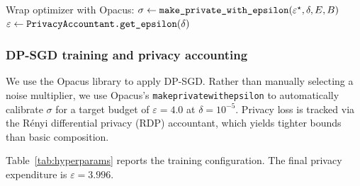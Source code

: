 \documentclass[12pt,letterpaper]{article}
\renewcommand{\_}{\textunderscore\allowbreak}
\begin{document}
\begin{algorithm}[ht]
\caption{DP-VAE training with DP-SGD}
\label{alg:dpvae}
Wrap optimizer with Opacus: $\sigma \gets \texttt{make\_private\_with\_epsilon}(\varepsilon^\star, \delta, E, B)$\;
$\varepsilon \gets \texttt{PrivacyAccountant.get\_epsilon}(\delta)$\;
\end{algorithm}

\subsubsection{DP-SGD training and privacy accounting}

We use the Opacus library to apply DP-SGD. Rather than manually selecting a noise multiplier, we use Opacus's \texttt{make\_private\_with\_epsilon} to automatically calibrate $\sigma$ for a target budget of $\varepsilon = 4.0$ at $\delta = 10^{-5}$. Privacy loss is tracked via the R\'{e}nyi differential privacy (RDP) accountant, which yields tighter bounds than basic composition.

Table~\ref{tab:hyperparams} reports the training configuration. The final privacy expenditure is $\varepsilon = 3.996$.
\end{document}
